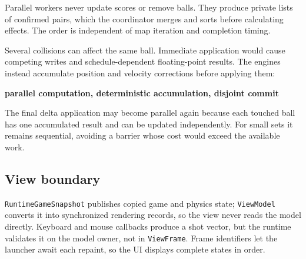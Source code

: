 Parallel workers never update scores or remove balls. They produce private
lists of confirmed pairs, which the coordinator merges and sorts before
calculating effects. The order is independent of map iteration and completion
timing.

Several collisions can affect the same ball. Immediate application would cause
competing writes and schedule-dependent floating-point results. The engines
instead accumulate position and velocity corrections before applying them:

\begin{center}
\textbf{parallel computation, deterministic accumulation, disjoint commit}
\end{center}

The final delta application may become parallel again because each touched
ball has one accumulated result and can be updated independently. For small
sets it remains sequential, avoiding a barrier whose cost would exceed the
available work.

\subsection{View boundary}

\texttt{RuntimeGameSnapshot} publishes copied game and physics state;
\texttt{ViewModel} converts it into synchronized rendering records, so the view
never reads the model directly. Keyboard and mouse callbacks produce a shot
vector, but the runtime validates it on the model owner, not in
\texttt{ViewFrame}. Frame identifiers let the launcher await each repaint, so
the UI displays complete states in order.

